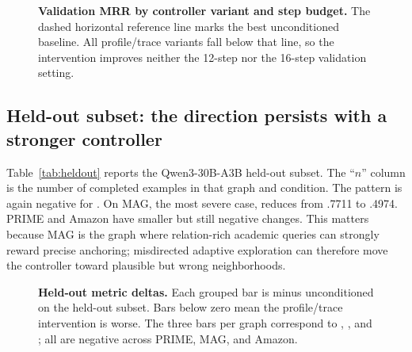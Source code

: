 \begin{figure}[t]
\centering
\resizebox{\columnwidth}{!}{}
\caption{\textbf{Validation MRR by controller variant and step budget.} The dashed horizontal reference line marks the best unconditioned baseline. All profile/trace variants fall below that line, so the intervention improves neither the 12-step nor the 16-step validation setting.}
\label{fig:validation_mrr}
\end{figure}

\subsection{Held-out subset: the direction persists with a stronger controller}
Table~\ref{tab:heldout} reports the Qwen3-30B-A3B held-out subset. The ``$n$'' column is the number of completed examples in that graph and condition. The pattern is again negative for \tb. On MAG, the most severe case, \tb reduces \mrr from .7711 to .4974. PRIME and Amazon have smaller but still negative changes. This matters because MAG is the graph where relation-rich academic queries can strongly reward precise anchoring; misdirected adaptive exploration can therefore move the controller toward plausible but wrong neighborhoods.



\begin{figure}[t]
\centering
\resizebox{\columnwidth}{!}{}
\caption{\textbf{Held-out metric deltas.} Each grouped bar is \tb minus unconditioned on the held-out subset. Bars below zero mean the profile/trace intervention is worse. The three bars per graph correspond to , , and \mrr; all are negative across PRIME, MAG, and Amazon.}
\label{fig:heldout_delta}
\end{figure}

\begin{table}[t]
\centering
\caption{\textbf{Held-out subset with Qwen3-30B-A3B.} Each row is one graph-condition cell. ``$n$'' gives completed examples. The \tb rows underperform the corresponding unconditioned rows on every graph.}
\label{tab:heldout}
\end{table}

